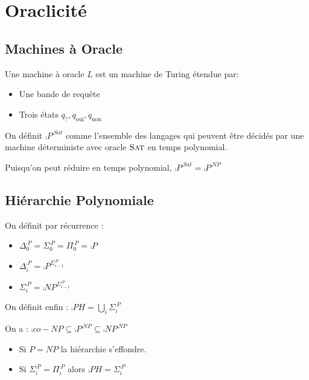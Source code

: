 \documentclass{cours}
\begin{document}
\section{Oraclicité}
\subsection{Machines à Oracle}
\begin{definition}
    Une machine à oracle $L$ est un machine de Turing étendue par: 
    \begin{itemize}
        \item Une bande de requête
        \item Trois états $q_{?}, q_{\text{oui}}, q_{\text{non}}$
    \end{itemize}
\end{definition}

\begin{definition}
    On définit $\comp{P}^{\comp{Sat}}$ comme l'ensemble des langages qui peuvent être décidés par une machine déterministe avec oracle $\textsc{Sat}$ en temps polynomial. 
\end{definition}

\begin{proposition}
    Puisqu'on peut réduire  en temps polynomial, $\comp{P}^{\comp{Sat}} = \comp{P}^{\comp{NP}}$
\end{proposition}

\subsection{Hiérarchie Polynomiale}
\begin{definition}
    On définit par récurrence : 
    \begin{itemize}
        \item $\Delta_{0}^{\comp{P}} = \Sigma_{0}^{\comp{P}} = \Pi_{0}^{\comp{P}} = \comp{P}$
        \item $\Delta_{i}^{\comp{P}} = \comp{P}^{\Sigma_{i - 1}^{\comp{P}}}$
        \item $\Sigma_{i}^{\comp{P}} = \comp{NP}^{\Sigma_{i - 1}^{\comp{P}}}$
    \end{itemize}
    On définit enfin : $\comp{PH} = \bigcup_{i}\Sigma_{i}^{\comp{P}}$
\end{definition}

\begin{proposition}
    On a : $\comp{co-NP} \subseteq \comp{P}^{\comp{NP}} \subseteq \comp{NP}^{\comp{NP}}$
    \begin{itemize}
        \item Si $P = NP$ la hiérarchie s'effondre.
        \item Si $\Sigma_{i}^{\comp{P}} = \Pi_{i}^{\comp{P}}$ alors $\comp{PH} = \Sigma_{i}^{\comp{P}}$
    \end{itemize}
\end{proposition}
\end{document}
